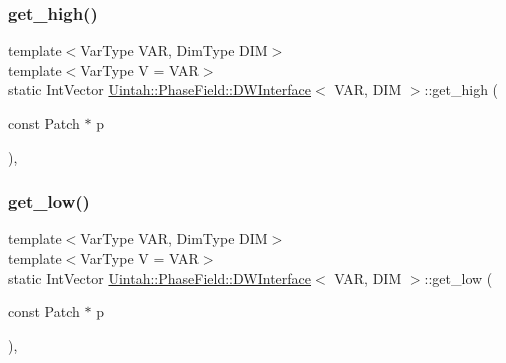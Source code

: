 \subsubsection{\texorpdfstring{get\+\_\+high()}{get\_high()}}
{\footnotesize\ttfamily template$<$Var\+Type V\+AR, Dim\+Type D\+IM$>$ \\
template$<$Var\+Type V = V\+AR$>$ \\
static Int\+Vector \hyperlink{structUintah_1_1PhaseField_1_1DWInterface}{Uintah\+::\+Phase\+Field\+::\+D\+W\+Interface}$<$ V\+AR, D\+IM $>$\+::get\+\_\+high (\begin{DoxyParamCaption}\item[{const Patch $\ast$}]{p }\end{DoxyParamCaption})\hspace{0.3cm}{\ttfamily [inline]}, {\ttfamily [static]}}

\mbox{\label{structUintah_1_1PhaseField_1_1DWInterface_aa7342c67207852dee747a79aaef18d0e}} 
\subsubsection{\texorpdfstring{get\+\_\+low()}{get\_low()}}
{\footnotesize\ttfamily template$<$Var\+Type V\+AR, Dim\+Type D\+IM$>$ \\
template$<$Var\+Type V = V\+AR$>$ \\
static Int\+Vector \hyperlink{structUintah_1_1PhaseField_1_1DWInterface}{Uintah\+::\+Phase\+Field\+::\+D\+W\+Interface}$<$ V\+AR, D\+IM $>$\+::get\+\_\+low (\begin{DoxyParamCaption}\item[{const Patch $\ast$}]{p }\end{DoxyParamCaption})\hspace{0.3cm}{\ttfamily [inline]}, {\ttfamily [static]}}

\mbox{\label{structUintah_1_1PhaseField_1_1DWInterface_aa1c394ba8e632d416d9a3da757055408}} 
